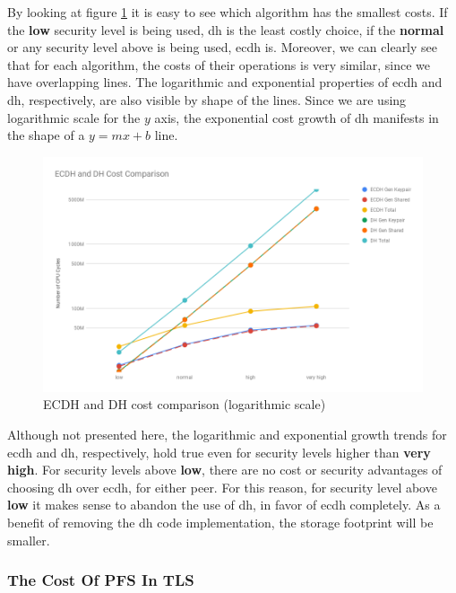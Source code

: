 \documentclass{llncs}
\begin{document}
By looking at figure \ref{fig:ecdh-dh-costs-all} it is easy to see which algorithm has the smallest costs. If the \textbf{low} security level is being used,
\gls{dh} is the least costly choice, if the \textbf{normal} or any security level above is being used, \gls{ecdh} is. Moreover, we can clearly see that
for each algorithm, the costs of their operations is very similar, since we have overlapping lines. The logarithmic and exponential properties of
\gls{ecdh} and \gls{dh}, respectively, are also visible by shape of the lines. Since we are using logarithmic scale for the $y$ axis, the
exponential cost growth of \gls{dh} manifests in the shape of a $y=mx+b$ line.

\begin{figure}
  \centering
  \includegraphics[width=1.0\textwidth]{img/ecdh_dh_costs_all.png}
  \centering \caption{\label{fig:ecdh-dh-costs-all} ECDH and DH cost comparison (logarithmic scale)}
\end{figure}

Although not presented here, the logarithmic and exponential growth trends for \gls{ecdh} and \gls{dh}, respectively, hold true even for
security levels higher than \textbf{very high}. For security levels above \textbf{low}, there are no cost or security
advantages of choosing \gls{dh} over \gls{ecdh}, for either peer. For this reason, for security level above \textbf{low} it makes sense to abandon the
use of \gls{dh}, in favor of \gls{ecdh} completely. As a benefit of removing the \gls{dh} code implementation, the storage footprint will be smaller.


\subsubsection{The Cost Of PFS In TLS} \label{sec:pfs-cost-in-tls}
\end{document}
